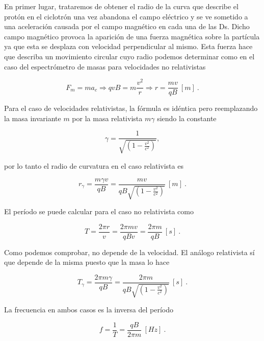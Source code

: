 \documentclass[journal]{IEEEtran}
\begin{document}
En primer lugar, trataremos de obtener el radio de la curva que describe el protón en el ciclotrón una vez abandona el campo eléctrico y se ve sometido a una aceleración causada por el campo magnético en cada una de las Ds. Dicho campo magnético provoca la aparición de una fuerza magnética sobre la partícula ya que esta se desplaza con velocidad perpendicular al mismo. Esta fuerza hace que describa un movimiento circular cuyo radio podemos determinar como en el caso del espectrómetro de masas para velocidades no relativistas

\begin{equation}
F_m = ma_c \Rightarrow qvB = m \displaystyle\frac{v^2}{r} \Rightarrow r = \displaystyle\frac{mv}{qB}~[m]~.
\end{equation}

Para el caso de velocidades relativistas, la fórmula es idéntica pero reemplazando la masa invariante $m$ por la masa relativista $m\gamma$ siendo la constante

\begin{equation}
\gamma = \displaystyle\frac{1}{\sqrt{(1-\displaystyle\frac{v^2}{c^2})}},
\end{equation}

por lo tanto el radio de curvatura en el caso relativista es

\begin{equation}
r_\gamma = \displaystyle\frac{m\gamma v}{qB} = \displaystyle\frac{mv}{qB\sqrt{(1-\displaystyle\frac{v^2}{c^2})}}~[m]~.
\end{equation}

El período se puede calcular para el caso no relativista como

\begin{equation}
T = \displaystyle\frac{2\pi r}{v} = \displaystyle\frac{2\pi mv}{qBv} = \displaystyle\frac{2\pi m}{qB}~[s]~.
\end{equation}

Como podemos comprobar, no depende de la velocidad. El análogo relativista sí que depende de la misma puesto que la masa lo hace

\begin{equation}
T_\gamma = \displaystyle\frac{2\pi m\gamma}{qB} = \displaystyle\frac{2\pi m}{qB\sqrt{(1-\displaystyle\frac{v^2}{c^2})}} ~[s]~.
\end{equation}

La frecuencia en ambos casos es la inversa del período

\begin{equation}
    f = \displaystyle\frac{1}{T} = \displaystyle\frac{qB}{2\pi m}~[Hz]~.
\end{equation}
\end{document}
